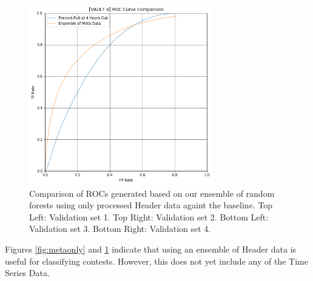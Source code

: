 \begin{figure}[h]
\includegraphics[width=8cm]{body/results/Graphs/JustMeta/3.Compare/v4.png}
\caption{Comparison of ROCs generated based on our ensemble of random forests using only processed Header data againt the baseline. Top Left: Validation set 1. Top Right: Validation set 2. Bottom Left: Validation set 3. Bottom Right: Validation set 4.}
\label{fig:metacomp}
\end{figure}

Figures \ref{fig:metaonly} and \ref{fig:metacomp} indicate that using an ensemble of Header data is useful for classifying contests. However, this does not yet include any of the Time Series Data.  



